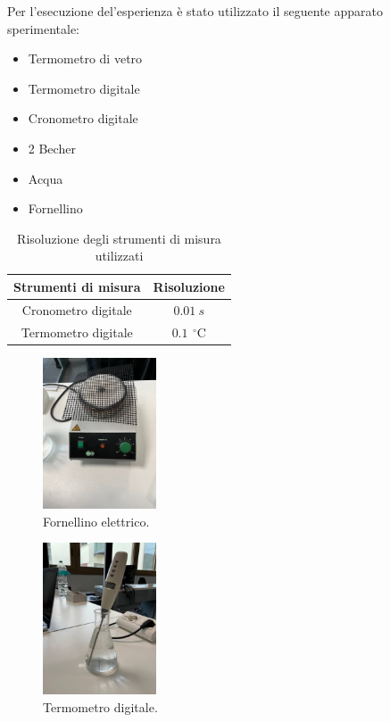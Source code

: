 Per l'esecuzione del'esperienza è stato utilizzato il seguente apparato sperimentale:
\begin{itemize}
    \item Termometro di vetro
    \item Termometro digitale
    \item Cronometro digitale
    \item 2 Becher
    \item Acqua
    \item Fornellino
\end{itemize}

\begin{table}[H]
	\centering
	\begin{tabular}{|c|c|}
		\hline
		\textbf{Strumenti di misura} & \textbf{Risoluzione} \\
		\hline
		Cronometro digitale & $0.01\ s$ \\
		Termometro digitale & $0.1\ \,^\circ\mathrm{C}$ \\
		\hline
	\end{tabular}
	\caption{Risoluzione degli strumenti di misura utilizzati}
	\label{tab:}
\end{table}

\begin{figure}[H]
	\centering
	\includegraphics[width=0.30\textwidth]{6.jpg}
	\caption{Fornellino elettrico.}
\end{figure}

\begin{figure}[H]
	\centering
	\includegraphics[width=0.30\textwidth]{2.jpg}
	\caption{Termometro digitale.}
\end{figure}


